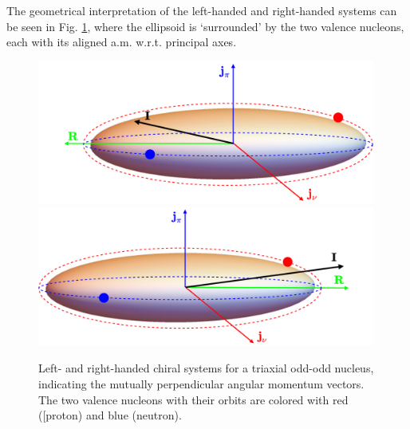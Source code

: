 The geometrical interpretation of the left-handed and right-handed systems can be seen in Fig. \ref{chiral-geometry}, where the ellipsoid is `surrounded' by the two valence nucleons, each with its aligned a.m. w.r.t. principal axes.

\begin{figure}
    \centering
    \includegraphics[width=0.99\textwidth]{Chapters/Figures/chiral_handedness-1.pdf}
    \includegraphics[width=0.99\textwidth]{Chapters/Figures/chiral_handedness-2.pdf}
    \caption{Left- and right-handed chiral systems for a triaxial odd-odd nucleus, indicating the mutually perpendicular angular momentum vectors. The two valence nucleons with their orbits are colored with red ([proton) and blue (neutron).}
    \label{chiral-geometry}
\end{figure}